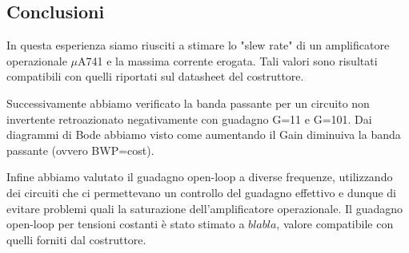 \subsection*{Conclusioni}

In questa esperienza siamo riusciti a stimare lo "slew rate" di un amplificatore operazionale $\mu$A741 e la massima corrente erogata. Tali valori sono risultati compatibili con quelli riportati sul datasheet del costruttore. 

Successivamente abbiamo verificato la banda passante per un circuito non invertente retroazionato negativamente con guadagno G=11 e G=101. Dai diagrammi di Bode abbiamo visto come aumentando il Gain diminuiva la banda passante (ovvero BWP=cost).

Infine abbiamo valutato il guadagno open-loop a diverse frequenze, utilizzando dei circuiti che ci permettevano un controllo del guadagno effettivo e dunque di evitare problemi quali la saturazione dell'amplificatore operazionale. Il guadagno open-loop per tensioni costanti è stato stimato a $blabla$, valore compatibile con quelli forniti dal costruttore.
